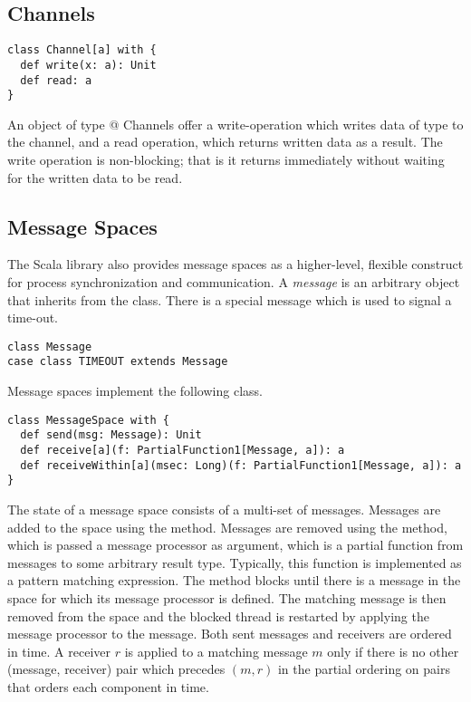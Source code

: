 \documentclass[11pt]{report}
\begin{document}
\subsection{Channels}

\begin{verbatim}
class Channel[a] with {
  def write(x: a): Unit
  def read: a
}
\end{verbatim}

An object of type \verb@Channel[a]@ Channels offer a write-operation
which writes data of type \verb@a@ to the channel, and a read
operation, which returns written data as a result. The write operation
is non-blocking; that is it returns immediately without waiting for
the written data to be read.

\subsection{Message Spaces}

The Scala library also provides message spaces as a higher-level,
flexible construct for process synchronization and communication. A
{\em message} is an arbitrary object that inherits from the
\verb@Message@ class.
There is a special message \verb@TIMEOUT@ which is used to signal a time-out.
\begin{verbatim}
class Message
case class TIMEOUT extends Message
\end{verbatim}
Message spaces implement the following class.
\begin{verbatim}
class MessageSpace with {
  def send(msg: Message): Unit
  def receive[a](f: PartialFunction1[Message, a]): a
  def receiveWithin[a](msec: Long)(f: PartialFunction1[Message, a]): a
}
\end{verbatim}
The state of a message space consists of a multi-set of messages.
Messages are added to the space using the \verb@send@ method. Messages
are removed using the \verb@receive@ method, which is passed a message
processor \verb@f@ as argument, which is a partial function from
messages to some arbitrary result type. Typically, this function is
implemented as a pattern matching expression. The \verb@receive@
method blocks until there is a message in the space for which its
message processor is defined.  The matching message is then removed
from the space and the blocked thread is restarted by applying the
message processor to the message. Both sent messages and receivers are
ordered in time. A receiver $r$ is applied to a matching message $m$
only if there is no other (message, receiver) pair which precedes $(m,
r)$ in the partial ordering on pairs that orders each component in
time.
\end{document}
